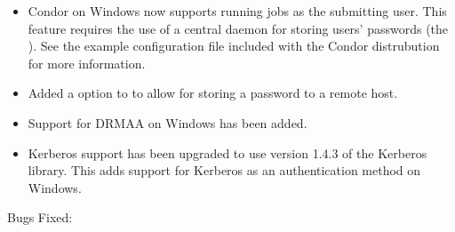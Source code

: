 \begin{itemize}
\item Condor on Windows now supports running jobs as the submitting
user. This feature requires the use of a central daemon for storing
users' passwords (the ). See the example configuration
file  included with the Condor
distrubution for more information.

\item Added a  option to  to allow for
storing a password to a remote host.

\item Support for DRMAA on Windows has been added.

\item Kerberos support has been upgraded to use version 1.4.3 of the
Kerberos library.  This adds support for Kerberos as an authentication
method on Windows.

\end{itemize}

\noindent Bugs Fixed:

